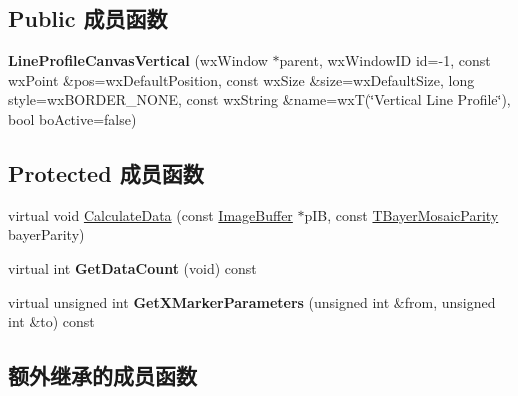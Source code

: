 \subsection*{Public 成员函数}
\begin{DoxyCompactItemize}
\item 
\hypertarget{class_line_profile_canvas_vertical_ac12fc327e811d0c1839f77bce76cdc22}{{\bfseries Line\+Profile\+Canvas\+Vertical} (wx\+Window $\ast$parent, wx\+Window\+I\+D id=-\/1, const wx\+Point \&pos=wx\+Default\+Position, const wx\+Size \&size=wx\+Default\+Size, long style=wx\+B\+O\+R\+D\+E\+R\+\_\+\+N\+O\+N\+E, const wx\+String \&name=wx\+T(\char`\"{}Vertical Line Profile\char`\"{}), bool bo\+Active=false)}\label{class_line_profile_canvas_vertical_ac12fc327e811d0c1839f77bce76cdc22}

\end{DoxyCompactItemize}
\subsection*{Protected 成员函数}
\begin{DoxyCompactItemize}
\item 
virtual void \hyperlink{class_line_profile_canvas_vertical_a66740734a1cb3885d959d5f248eb6d6e}{Calculate\+Data} (const \hyperlink{struct_image_buffer}{Image\+Buffer} $\ast$p\+I\+B, const \hyperlink{group___common_interface_ga9e2a1b46f3ed21b46b867c6d88d25598}{T\+Bayer\+Mosaic\+Parity} bayer\+Parity)
\item 
\hypertarget{class_line_profile_canvas_vertical_a3eb16ed9ffd5024b5c636d600dc9f05e}{virtual int {\bfseries Get\+Data\+Count} (void) const }\label{class_line_profile_canvas_vertical_a3eb16ed9ffd5024b5c636d600dc9f05e}

\item 
\hypertarget{class_line_profile_canvas_vertical_aa824b2cad102ed59df534e477be79290}{virtual unsigned int {\bfseries Get\+X\+Marker\+Parameters} (unsigned int \&from, unsigned int \&to) const }\label{class_line_profile_canvas_vertical_aa824b2cad102ed59df534e477be79290}

\end{DoxyCompactItemize}
\subsection*{额外继承的成员函数}


